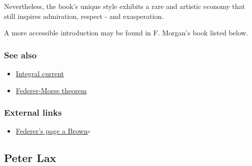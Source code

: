 \documentclass{article}
\begin{document}
Nevertheless, the book's unique style exhibits a rare and artistic economy that still inspires admiration, respect - and exasperation.

A more accessible introduction may be found in F. Morgan's book listed below.

\subsubsection{See also}
\begin{itemize}
	\item \href{https://en.wikipedia.org/wiki/Integral_current}{Integral current}
	\item \href{https://en.wikipedia.org/wiki/Federer-Morse_theorem}{Federer-Morse theorem}
\end{itemize}

\subsubsection{External links}
\begin{itemize}
	\item \href{https://web.archive.org/web/20070426204453/http://www.math.brown.edu/faculty/federer.html}{Federer's page a Brown}\hfill$\square$
\end{itemize}



\subsection{Peter Lax}

\end{document}
